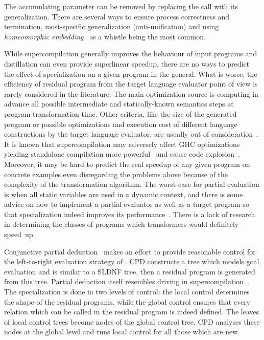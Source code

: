 The accumulating parameter can be removed by replacing the call with its generalization.
There are several ways to ensure process correctness and termination, most-specific generalization
(anti-unification) and using \emph{homeomorphic embedding}~\cite{Higman52,Kruskal60} as a
whistle being the most common.

While supercompilation generally improves the behaviour of input programs and distillation can even provide superlinear speedup, there are no ways to predict the effect of specialization on a given program in the general.
What is worse, the efficiency of residual program from the target language evaluator point of view is rarely considered in the literature.
The main optimization source is computing in advance all possible intermediate and statically-known semantics steps at program transformation-time.
Other criteria, like the size of the generated program or possible optimizations and execution cost of different language constructions by the target language evaluator, are usually out of consideration~\cite{jonesbook}.
It is known that supercompilation may adversely affect GHC optimizations yielding standalone compilation more powerful~\cite{SCBE,TCES} and cause code explosion~\cite{SCHC}.
Moreover, it may be hard to predict the real speedup of any given program on concrete examples even disregarding the problems above because of the complexity of the transformation algorithm.
The worst-case for partial evaluation is when all static variables are used in a dynamic context, and there is some advice on how to implement a partial evaluator as well as a target program so that specialization indeed improves its performance~\cite{jonesbook,bulyonkov84}.
There is a lack of research in determining the classes of programs which transformers would definitely speed~up.

Conjunctive partial deduction~\cite{de1999conjunctive} makes an effort to provide reasonable control for the left-to-right evaluation strategy of \pro.
CPD constructs a tree which models goal evaluation and is similar to a SLDNF tree, then a residual program is generated from this tree.
Partial deduction itself resembles driving in supercompilation~\cite{gluck1994partial}.
The specialization is done in two levels of control: the local control determines the shape of the residual programs, while the global control ensures that every relation which can be called in the residual program is indeed defined.
The leaves of local control trees become nodes of the global control tree.
CPD analyses these nodes at the global level and runs local control for all those which are new.

